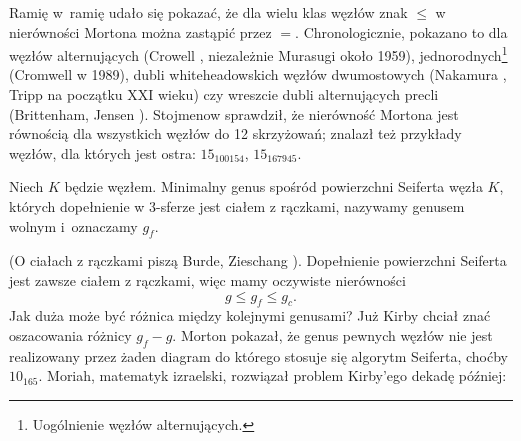 Ramię w~ramię udało się pokazać, że dla wielu klas węzłów znak $\le$ w nierówności Mortona można zastąpić przez $=$.
Chronologicznie, pokazano to dla węzłów alternujących (Crowell \cite{crowellrichard1959}, niezależnie Murasugi \cite{murasugi1958} około 1959),
%
%
%
jednorodnych\footnote{Uogólnienie węzłów alternujących.} (Cromwell \cite{cromwell1989} w 1989),
%
%
dubli whiteheadowskich węzłów dwumostowych (Nakamura \cite{nakamura2006}, Tripp \cite{tripp2002} na początku XXI wieku)
%
%
%
%
czy wreszcie dubli alternujących precli (Brittenham, Jensen \cite{brittenham2006}).
%
%
%
Stojmenow \cite{stoimenow2002} sprawdził, że nierówność Mortona jest równością dla wszystkich węzłów do 12 skrzyżowań; znalazł też przykłady węzłów, dla których jest ostra: $15_{100154}$, $15_{167945}$.
%

\begin{definition}
%
%
    Niech $K$ będzie węzłem.
    Minimalny genus spośród powierzchni Seiferta węzła $K$, których dopełnienie w 3-sferze jest ciałem z rączkami, nazywamy genusem wolnym i~oznaczamy $g_f$.
\end{definition}

(O ciałach z rączkami piszą Burde, Zieschang \cite[s. 44-48]{burde2014}).
Dopełnienie powierzchni Seiferta jest zawsze ciałem z rączkami, więc mamy oczywiste nierówności
\begin{equation}
    g \le g_f \le g_c.
\end{equation}
Jak duża może być różnica między kolejnymi genusami?
Już Kirby \cite[problem 1.20a]{kirby1978} chciał znać oszacowania różnicy $g_f - g$.
Morton \cite{morton1986} pokazał, że genus pewnych węzłów nie jest realizowany przez żaden diagram do którego stosuje się algorytm Seiferta, choćby $10_{165}$.
%
Moriah, matematyk izraelski, rozwiązał problem Kirby'ego dekadę później:
%

